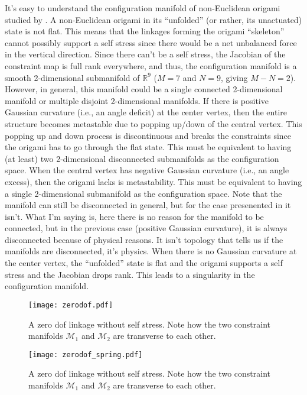 It's easy to understand the configuration manifold of non-Euclidean origami studied by \cite{berry2020}.
A non-Euclidean origami in its ``unfolded'' (or rather, its unactuated) state is not flat.
This means that the linkages forming the origami ``skeleton'' cannot possibly support a self stress since there would be a net unbalanced force in the vertical direction.
Since there can't be a self stress, the Jacobian of the constraint map is full rank everywhere, and thus, the configuration manifold is a smooth 2-dimensional submanifold of $\mathbb{R}^9$ ($M = 7$ and $N = 9$, giving $M - N = 2$).
However, in general, this manifold could be a single connected 2-dimensional manifold or multiple disjoint 2-dimensional manifolds.
If there is positive Gaussian curvature (i.e., an angle deficit) at the center vertex, then the entire structure becomes metastable due to popping up/down of the central vertex.
This popping up and down process is discontinuous and breaks the constraints since the origami has to go through the flat state.
This must be equivalent to having (at least) two 2-dimensional disconnected submanifolds as the configuration space.
When the central vertex has negative Gaussian curvature (i.e., an angle excess), then the origami lacks is metastability.
This must be equivalent to having a single 2-dimensional submanifold as the configuration space.
Note that the manifold can still be disconnected in general, but for the case presenented in \cite{berry2020} it isn't.
What I'm saying is, here there is no reason for the manifold to be connected, but in the previous case (positive Gaussian curvature), it is always disconnected because of physical reasons.
It isn't topology that tells us if the manifolds are disconnected, it's physics.
When there is no Gaussian curvature at the center vertex, the ``unfolded'' state is flat and the origami supports a self stress and the Jacobian drops rank.
This leads to a singularity in the configuration manifold.

\begin{figure}
  \begin{center}
    \texttt{[image: zerodof.pdf]}
  \end{center}
\caption{A zero \ac{dof} linkage without self stress.  Note how the two constraint manifolds $\mathcal{M}_1$ and $\mathcal{M}_2$ are transverse to each other.}
  \label{fig:hello}
\end{figure}

\begin{figure}
  \begin{center}
    \texttt{[image: zerodof\_spring.pdf]}
  \end{center}
\caption{A zero \ac{dof} linkage without self stress.  Note how the two constraint manifolds $\mathcal{M}_1$ and $\mathcal{M}_2$ are transverse to each other.}
  \label{fig:hello2}
\end{figure}
\pagebreak

